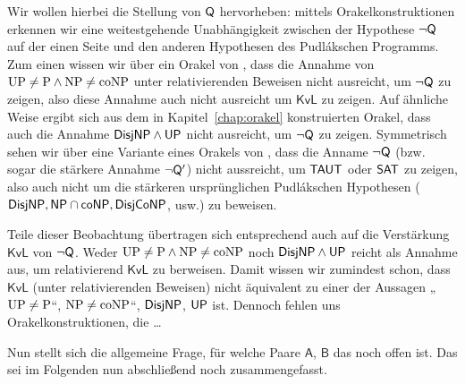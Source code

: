 Wir wollen hierbei die Stellung von $\mathsf{Q}$ hervorheben: mittels Orakelkonstruktionen erkennen wir eine weitestgehende Unabhängigkeit zwischen der Hypothese $\neg\mathsf{Q}$ auf der einen Seite und den anderen Hypothesen des Pudlákschen Programms. Zum einen wissen wir 
über ein Orakel von \textcite[Thm.~12.3]{fenner_inverting_2003}, dass die Annahme von $\mathrm{UP}\neq\mathrm{P}\land \mathrm{NP}\neq\mathrm{coNP}$ unter relativierenden Beweisen nicht ausreicht, um $\neg\mathsf{Q}$ zu zeigen, also diese Annahme auch nicht ausreicht um $\mathsf{KvL}$ zu zeigen.
Auf ähnliche Weise ergibt sich aus dem in Kapitel~\ref{chap:orakel} konstruierten Orakel, dass auch die Annahme $\mathsf{DisjNP}\land\mathsf{UP}$ nicht ausreicht, um $\neg\mathsf{Q}$ zu zeigen.
Symmetrisch sehen wir über eine Variante eines Orakels von \textcite{dose_further_2020}, dass die Anname $\neg\mathsf{Q}$ (bzw. sogar die stärkere Annahme $\neg\mathsf{Q}'$) nicht aussreicht, um $\mathsf{TAUT}$ oder $\mathsf{SAT}$ zu zeigen, also auch nicht um die stärkeren ursprünglichen Pudlákschen Hypothesen ($\mathsf{DisjNP}, \mathsf{NP}{}\cap{}\mathsf{coNP}, \mathsf{DisjCoNP}$, usw.) zu beweisen.

Teile dieser Beobachtung übertragen sich entsprechend auch auf die Verstärkung $\mathsf{KvL}$ von $\neg\mathsf{Q}$. Weder $\mathrm{UP}\neq\mathrm{P}\land \mathrm{NP}\neq\mathrm{coNP}$ noch $\mathsf{DisjNP}\land\mathsf{UP}$ reicht als Annahme aus, um relativierend $\mathsf{KvL}$ zu berweisen.
Damit wissen wir zumindest schon, dass $\mathsf{KvL}$ (unter relativierenden Beweisen) nicht äquivalent zu einer der Aussagen „$\mathrm{UP}\neq \mathrm{P}$“, $\mathrm{NP}\neq\mathrm{coNP}$“, $\mathsf{DisjNP}$, $\mathsf{UP}$ ist.
Dennoch fehlen uns Orakelkonstruktionen, die \ldots

\todo{}

Nun stellt sich die allgemeine Frage, für welche Paare $\mathsf{A}$, $\mathsf{B}$ das noch offen ist.
Das sei im Folgenden nun abschließend noch zusammengefasst.

